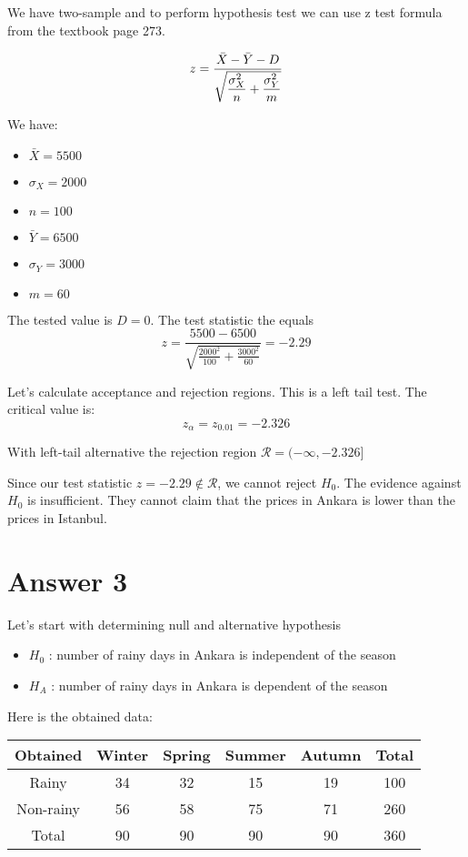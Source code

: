 \documentclass[12pt]{article}
\begin{document}
We have two-sample and to perform hypothesis test we can use z test formula from the textbook page 273.

$$z =\dfrac{\Bar{X} - \Bar{Y} - D}{\sqrt{\dfrac{\sigma_X^2}{n} + \dfrac{\sigma_Y^2}{m} }}$$

We have:
\begin{multicols}{2}
    \begin{itemize}
        \item $\bar{X} = 5500$
        \item $\sigma_X = 2000$
        \item $n = 100 $
        \item $\bar{Y} = 6500$
        \item $\sigma_Y = 3000$
        \item $m = 60 $
    \end{itemize}
\end{multicols}
The tested value is $D = 0 $. The test statistic the equals
$$z = \dfrac{5500 - 6500}{\sqrt{\frac{2000^2}{100} + \frac{3000^2}{60}}} = -2.29$$

Let's calculate acceptance and rejection regions. This is a left tail test. The critical value is:
$$z_\alpha = z_{0.01} = -2.326$$

With left-tail alternative the rejection region $\mathcal{R} = (-\infty, -2.326]$


Since our test statistic $z = -2.29 \notin \mathcal{R}$, we cannot reject $H_0$. The evidence against $H_0$ is insufficient. They cannot claim that the prices in Ankara is lower than the prices in Istanbul.

\section*{Answer 3}
Let's start with determining null and alternative hypothesis
\begin{itemize}
    \item $H_0$ : number of rainy days in Ankara is independent of the season
    \item $H_A$ : number of rainy days in Ankara is dependent of the season
\end{itemize}

Here is the obtained data: \\
\begin{center}
    \begin{tabular}{c|c c c c|c}
    Obtained  & Winter & Spring & Summer & Autumn & Total \\ \hline
    Rainy     & 34     & 32     & 15     & 19     & 100       \\
    Non-rainy & 56     & 58     & 75     & 71     & 260       \\ \hline
    Total & 90     & 90     & 90     & 90     & 360      
    \end{tabular}
\end{center}
\end{document}
